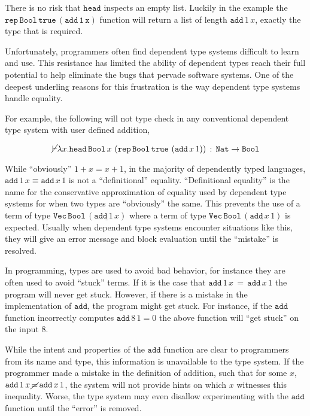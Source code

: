 There is no risk that $\mathtt{head}$ inspects an empty list.
Luckily in the example the $\mathtt{\mathtt{rep}\,\mathtt{Bool}\,\mathtt{true}\,\left(\mathtt{add}\,1\,x\right)}$ function will return a list of length $\mathtt{add}\,1\,x$, exactly the type that is required.


Unfortunately, programmers often find dependent type systems difficult to learn and use.
This resistance has limited the ability of dependent types reach their full potential to help eliminate the bugs that pervade software systems.
One of the deepest underling reasons for this frustration is the way dependent type systems handle equality.

For example, the following will not type check in any conventional dependent type system with user defined addition,

\[
\cancel{\vdash}\lambda x.\mathtt{head}\,\mathtt{Bool}\,x\,\left(\mathtt{rep}\,\mathtt{Bool}\,\mathtt{true}\,\left(\mathtt{add}\,x\,1\right)\right)\,:\,\mathtt{Nat}\rightarrow\mathtt{Bool}
\]

While ``obviously'' $1+x=x+1$, in the majority of dependently typed languages, $\mathtt{add}\,1\,x\equiv\mathtt{add}\,x\,1$ is not a ``definitional'' equality.
``Definitional equality'' is the name for the conservative approximation of equality used by dependent type systems for when two types are ``obviously'' the same.
This prevents the use of a term of type $\mathtt{Vec}\,\mathtt{Bool}\,\left(\underline{\mathtt{add}\,1\,x}\right)$
where a term of type $\mathtt{Vec}\,\mathtt{Bool}\,\left(\underline{\mathtt{add}\,x\,1}\right)$
is expected.
Usually when dependent type systems encounter situations like this, they will give an error message and block evaluation until the ``mistake'' is resolved.

In programming, types are used to avoid bad behavior, for instance they are often used to avoid ``stuck'' terms.
If it is the case that $\mathtt{add}\,1\,x\,=\,\mathtt{add}\,x\,1$ the program will never get stuck.
However, if there is a mistake in the implementation of $\mathtt{add}$, the program might get stuck.
For instance, if the $\mathtt{add}$ function incorrectly computes $\mathtt{add}\,8\,1=0$ the above function will ``get stuck'' on the input $8$. 

While the intent and properties of the $\mathtt{add}$ function are clear to programmers from its name and type, this information is unavailable to the type system.
If the programmer made a mistake in the definition of addition, such that for some $x$, $\mathtt{add}\,1\,x\,\cancel{=}\,\mathtt{add}\,x\,1$, the system will not provide hints on which $x$ witnesses this inequality.
Worse, the type system may even disallow experimenting with the $\mathtt{add}$ function until the ``error'' is removed.

